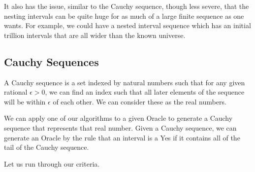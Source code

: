 \documentclass[12pt]{article}
\theoremstyle{remark}
\begin{document}
It also has the issue, similar to the Cauchy sequence, though less severe, that the nesting intervals can be quite huge for as much of a large finite sequence as one wants. For example, we could have a nested interval sequence which has an initial trillion intervals that are all wider than the known universe. 


\subsection{Cauchy Sequences}

A Cauchy sequence is a set indexed by natural numbers such that for any given rational $\epsilon > 0$, we can find an index such that all later elements of the sequence will be within $\epsilon$ of each other. We can consider these as the real numbers. 

We can apply one of our algorithms to a given Oracle to generate a Cauchy sequence that represents that real number. Given a Cauchy sequence, we can generate an Oracle by the rule that an interval is a Yes if it contains all of the tail of the Cauchy sequence. 

Let us run through our criteria. 
\end{document}
